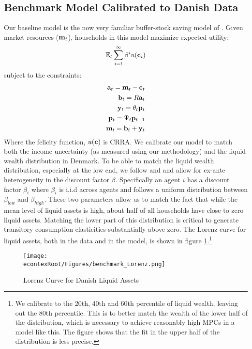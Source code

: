 \documentclass[titlepage]{\econtex}\newcommand{\texname}{ConsumptionHeterogeneity}
\begin{document}
\subsection{Benchmark Model Calibrated to Danish Data} \label{benchmark_model}
Our baseline model is the now very familiar buffer-stock saving model of \cite{carroll_buffer_1997}. Given market resources ($\boldmath{\ensuremath{\mathbf{m}}}_t$), households in this model maximize expected utility:
\begin{align*}
	\mathbb{E}_t \sum_{i=t}^{\infty} \beta^i u(\mathbf{c}_i)
\end{align*}
subject to the constraints:
\begin{align*}
	\mathbf{a}_t = \mathbf{m}_t - \mathbf{c}_t \\
	\mathbf{b}_t = R\mathbf{a}_t \\
	\mathbf{y}_t = \theta_t \mathbf{p}_t \\
	\mathbf{p}_t = \Psi_t \mathbf{p}_{t-1} \\
	\mathbf{m}_t = \mathbf{b}_t + \mathbf{y}_t
\end{align*}
Where the felicity function, $u(\mathbf{c})$ is CRRA. We calibrate our model to match both the income uncertainty (as measured using our methodology) and the liquid wealth distribution in Denmark. To be able to match the liquid wealth distribution, especially at the low end, we follow \cite{krusell_income_1998} and \cite{carroll_distribution_2017} and allow for ex-ante heterogeneity in the discount factor $\beta$. Specifically an agent $i$ has a discount factor $\beta_i$ where $\beta_i$ is i.i.d across agents and follows a uniform distribution between $\beta_{low}$ and $\beta_{high}$. These two parameters allow us to match the fact that while the mean level of liquid assets is high, about half of all households have close to zero liquid assets. Matching the lower part of this distribution is critical to generate transitory consumption elasticities substantially above zero. The Lorenz curve for liquid assets, both in the data and in the model, is shown in figure \ref{fig:Lorenz}.\footnote{We calibrate to the 20th, 40th and 60th percentile of liquid wealth, leaving out the 80th percentile. This is to better match the wealth of the lower half of the distribution, which is necessary to achieve reasonably high MPCs in a model like this. The figure shows that the fit in the upper half of the distribution is less precise.}
\begin{figure} 
		\centering
		\texttt{[image: \\econtexRoot/Figures/benchmark\_Lorenz.png]}
		\caption{Lorenz Curve for Danish Liquid Assets}
		\label{fig:Lorenz}
\end{figure}
\end{document}
